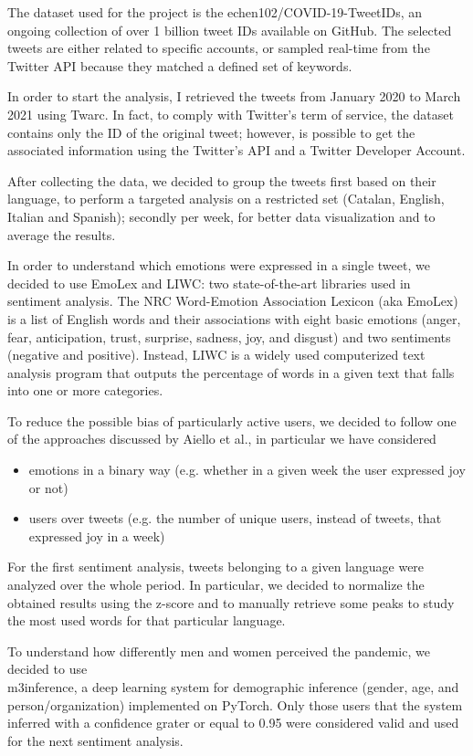 The dataset used for the project is the echen102/COVID-19-TweetIDs, an ongoing collection of over 1 billion tweet IDs available on GitHub. The selected tweets are either related to specific accounts, or sampled real-time from the Twitter API because they matched a defined set of keywords.

In order to start the analysis, I retrieved the tweets from January 2020 to March 2021 using Twarc. In fact, to comply with Twitter's term of service, the dataset contains only the ID of the original tweet; however, is possible to get the associated information using the Twitter's API and a Twitter Developer Account.

After collecting the data, we decided to group the tweets first based on their language, to perform a targeted analysis on a restricted set (Catalan, English, Italian and Spanish); secondly per week, for better data visualization and to average the results.

In order to understand which emotions were expressed in a single tweet, we decided to use EmoLex and LIWC: two state-of-the-art libraries used in sentiment analysis. The NRC Word-Emotion Association Lexicon (aka EmoLex) is a list of English words and their associations with eight basic emotions (anger, fear, anticipation, trust, surprise, sadness, joy, and disgust) and two sentiments (negative and positive). Instead, LIWC is a widely used computerized text analysis program that outputs the percentage of words in a given text that falls into one or more categories.

To reduce the possible bias of particularly active users, we decided to follow one of the approaches discussed by Aiello et al., in particular we have considered
	
\begin{itemize}
	\item emotions in a binary way (e.g. whether in a given week the user expressed joy or not)
	\item users over tweets (e.g. the number of unique users, instead of tweets, that expressed joy in a week)
\end{itemize}

For the first sentiment analysis, tweets belonging to a given language were analyzed over the whole period. In particular, we decided to normalize the obtained results using the z-score and to manually retrieve some peaks to study the most used words for that particular language.

To understand how differently men and women perceived the pandemic, we decided to use\\ m3inference, a deep learning system for demographic inference (gender, age, and person/organization) implemented on PyTorch. Only those users that the system inferred with a confidence grater or equal to 0.95 were considered valid and used for the next sentiment analysis.

